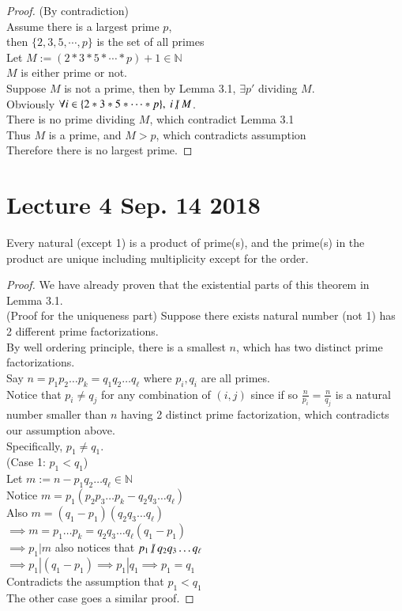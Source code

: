 \documentclass[11pt]{article}
\begin{document}
	\begin{proof}
		(By contradiction) \\
		Assume there is a largest prime $p$, \\
		then $\{2,3,5,\cdots,p\}$ is the set of all primes \\
		Let $M := (2*3*5*\cdots*p)+1 \in \mathbb{N}$ \\
		$M$ is either prime or not. \\
		Suppose $M$ is not a prime, then by Lemma 3.1, $\exists p' $ dividing $M$. \\
		Obviously $\forall i \in \{2*3*5*\cdots*p\},\ i \centernot | M$. \\
		There is no prime dividing $M$, which contradict Lemma 3.1 \\
		Thus $M$ is a prime, and $M > p$, which contradicts assumption \\
		Therefore there is no largest prime.
	\end{proof}
	
	\section{Lecture 4 Sep. 14 2018}
	\begin{theorem}
		Every natural (except 1) is a product of prime(s), and the prime(s) in the product are unique including multiplicity except for the order.
	\end{theorem}
	\begin{proof}
		We have already proven that the existential parts of this theorem in Lemma 3.1. \\
		(Proof for the uniqueness part) Suppose there exists natural number (not 1) has 2 different prime factorizations. \\
		By well ordering principle, there is a smallest $n$, which has two distinct prime factorizations. \\
		Say $n = p_1 p_2 \dots p_k = q_1 q_2 \dots q_\ell $ where $p_i, q_i$ are all primes. \\
		Notice that $p_i \neq q_j$ for any combination of $(i,j)$ since if so $\frac{n}{p_i}=\frac{n}{q_j}$ is a natural number smaller than $n$ having 2 distinct prime factorization, which contradicts our assumption above. \\
		Specifically, $p_1 \neq q_1$. \\
		(Case 1: $p_1 < q_1$) \\
		Let $m := n - p_1 q_2 \dots q_\ell \in \mathbb{N}$ \\
		Notice $m = p_1 (p_2 p_3 \dots p_k - q_2 q_3 \dots q_\ell)$ \\
		Also $m = (q_1 - p_1) (q_2 q_3 \dots q_\ell)$ \\
		$\implies m = p_1 \dots p_k = q_2 q_3 \dots q_\ell (q_1 - p_1)$ \\
		$\implies p_1 | m $ also notices that $p_1 \centernot | q_2 q_3 \dots q_\ell$ \\
		$\implies p_1 |  (q_1 - p_1) \implies p_1 | q_1 \implies p_1 = q_1$ \\
		Contradicts the assumption that $p_1 < q_1$ \\
		The other case goes a similar proof.
	\end{proof}
	
\end{document}
